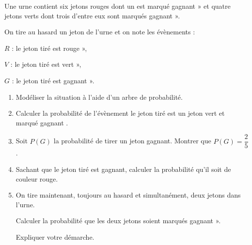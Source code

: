 \bigskip

Une urne contient six jetons rouges dont un est marqué \og gagnant » et quatre jetons verts dont trois d'entre eux sont marqués \og gagnant ».

\begin{list}{}{On tire au hasard un jeton de l'urne et on note les évènements :}
\item $R$ : \og le jeton tiré est rouge »,
\item $V$ : \og le jeton tiré est vert »,
\item $G$ : \og le jeton tiré est gagnant ».
\end{list}

\medskip

\begin{enumerate}
\item  Modéliser la situation à l'aide d'un arbre de probabilité.

\item Calculer la probabilité de l'évènement \og le jeton tiré est un jeton vert et marqué gagnant \fg.

\item Soit $P(G)$ la probabilité de tirer un jeton gagnant. Montrer que $P(G) = \dfrac{2}{5}$.

\item Sachant que le jeton tiré est gagnant, calculer la probabilité qu'il soit de couleur rouge.

\item On tire maintenant, toujours au hasard et simultanément, deux jetons dans l'urne.

Calculer la probabilité que les deux jetons soient marqués \og gagnant ». 

Expliquer votre démarche.
\end{enumerate}

\vspace{0.5cm}
